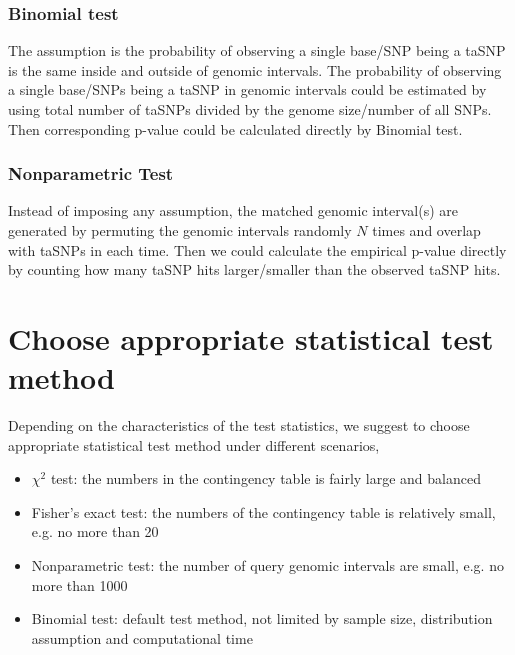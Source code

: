 \documentclass{article}
\begin{document}
\subsubsection{Binomial test}
The assumption is the probability of observing a single base/SNP being a taSNP is the same inside and outside of genomic intervals. The probability of observing a single base/SNPs being a taSNP in genomic intervals could be estimated by using total number of taSNPs divided by the genome size/number of all SNPs. Then corresponding p-value could be calculated directly by Binomial test.

\subsubsection{Nonparametric Test}
Instead of imposing any assumption, the matched genomic interval(s) are generated by permuting the genomic intervals randomly $N$ times and overlap with taSNPs in each time. Then we could calculate the empirical p-value directly by counting how many taSNP hits larger/smaller than the observed taSNP hits.


\section{Choose appropriate statistical test method}
Depending on the characteristics of the test statistics, we suggest to choose appropriate statistical test method under different scenarios,
\begin{itemize}
\item ${\chi}^2$  test:  the numbers in the contingency table is fairly large and balanced
\item  Fisher's exact test: the numbers of the contingency table is relatively small, e.g. no more than 20
\item  Nonparametric test: the number of query genomic intervals are small, e.g. no more than 1000
\item  Binomial test: default test method, not limited by sample size, distribution assumption and computational time
\end{itemize}
\end{document}
